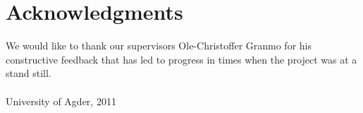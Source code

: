 \clearpage
{}
\chapter*{Acknowledgments}
\vspace{1.0in}
We would like to thank our supervisors Ole-Christoffer Granmo for his constructive feedback that has led to progress in times when the project was at a stand still. \\\\

{University of Agder, 2011}\\
\newpage
